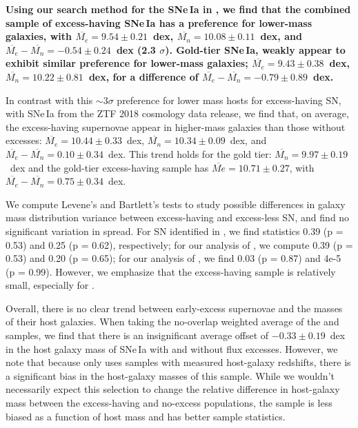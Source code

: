 \documentclass[twocolumn,twocolappendix, linenumbers]{aastex631} %
\begin{document}
{\bf Using our search method for the SNe\,Ia in \cite{Yao19}, we find that the combined sample of excess-having SNe\,Ia has a preference for lower-mass galaxies, with $\overline{M_{e}} = 9.54 \pm 0.21$~dex, $\overline{M_{n}} = 10.08 \pm 0.11$~dex, and $\overline{M_{e}} -\overline{M_n} = -0.54 \pm 0.24$~dex (2.3 $\sigma$). Gold-tier SNe\,Ia, weakly appear to exhibit similar preference for lower-mass galaxies; $\overline{M_{e}} = 9.43 \pm 0.38$~dex, $\overline{M_{n}} = 10.22 \pm 0.81$~dex, for a difference of $\overline{M_{e}} -\overline{M_n} =  -0.79 \pm 0.89$~dex. 

In contrast with this $\sim 3\sigma$ preference for lower mass hosts for excess-having SN, with SNe\,Ia from the ZTF 2018 cosmology data release, we find that, on average, the excess-having supernovae appear in higher-mass galaxies than those without excesses: $\overline{M_e} = 10.44 \pm 0.33$~dex, $\overline{M_n} = 10.34 \pm 0.09$~dex, and $\overline{M_e} - \overline{M_n} = 0.10 \pm 0.34$~dex. This trend holds for the gold tier: $\overline{M_n} = 9.97 \pm 0.19$~dex and the gold-tier excess-having sample has $\overline{M{e}} = 10.71 \pm 0.27$, with $\overline{M_{e}} -\overline{M_n} = 0.75 \pm 0.34$~dex.}

We compute Levene's and Bartlett's tests to study possible differences in galaxy mass distribution variance between excess-having and excess-less SN, and find no significant variation in spread. For SN identified in \cite{Burke22b}, we find statistics 0.39 (p = 0.53) and 0.25 (p = 0.62), respectively; for our analysis of \cite{Yao19}, we compute 0.39 (p = 0.53) and 0.20 (p = 0.65); for our analysis of \cite{Dhawan22}, we find 0.03 (p = 0.87) and 4e-5 (p = 0.99). However, we emphasize that the excess-having sample is relatively small, especially for \cite{Dhawan22}.

Overall, there is no clear trend between early-excess supernovae and the masses of their host galaxies. When taking the no-overlap weighted average of the \citet{Yao19} and \citet{Dhawan22} samples, we find that there is an insignificant average offset of $-0.33 \pm 0.19$~dex in the host galaxy mass of SNe\,Ia with and without flux excesses. However, we note that because \citet{Dhawan22} only uses samples with measured host-galaxy redshifts, there is a significant bias in the host-galaxy masses of this sample.  While we wouldn't necessarily expect this selection to change the relative difference in host-galaxy mass between the excess-having and no-excess populations, the \citet{Yao19} sample is less biased as a function of host mass and has better sample statistics.
\end{document}
